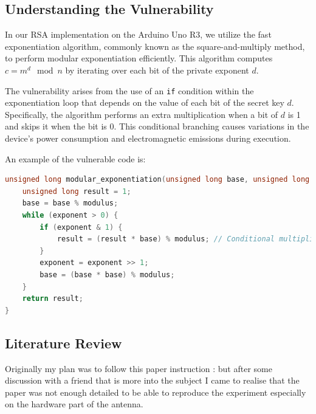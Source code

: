 \documentclass{article}
\begin{document}
\subsection{Understanding the Vulnerability}

In our RSA implementation on the Arduino Uno R3, we utilize the fast exponentiation algorithm, commonly known as the square-and-multiply method, to perform modular exponentiation efficiently. This algorithm computes $c = m^d \mod n$ by iterating over each bit of the private exponent \( d \).

The vulnerability arises from the use of an \texttt{if} condition within the exponentiation loop that depends on the value of each bit of the secret key \( d \). Specifically, the algorithm performs an extra multiplication when a bit of \( d \) is 1 and skips it when the bit is 0. This conditional branching causes variations in the device's power consumption and electromagnetic emissions during execution.

An example of the vulnerable code is:
\begin{lstlisting}[language=C]
unsigned long modular_exponentiation(unsigned long base, unsigned long exponent, unsigned long modulus) {
    unsigned long result = 1;
    base = base % modulus;
    while (exponent > 0) {
        if (exponent & 1) {
            result = (result * base) % modulus; // Conditional multiplication
        }
        exponent = exponent >> 1;
        base = (base * base) % modulus;
    }
    return result;
}
\end{lstlisting}

\subsection{Literature Review}
Originally my plan was to follow this paper instruction : \cite{cheapEM} but after some discussion with a friend that is more into the subject I came to realise that the paper was not enough detailed to be able to reproduce the experiment especially on the hardware part of the antenna.
\end{document}
